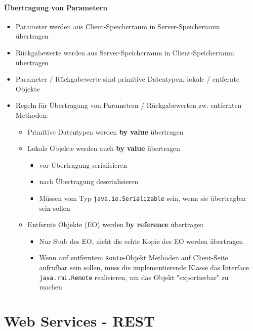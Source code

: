 \documentclass[a4paper]{article}
\begin{document}
				\paragraph{Übertragung von Parametern}
				
					\begin{itemize}
						\item Parameter werden aus Client-Speicherraum in Server-Speicherraum übertragen
						\item Rückgabewerte werden aus Server-Speicherraum in Client-Speicherraum übertragen
						\item Parameter / Rückgabewerte sind primitive Datentypen, lokale / entfernte Objekte\\
						
						\item Regeln für Übertragung von Parametern / Rückgabewerten zw. entfernten Methoden:
							\begin{itemize}
								\item Primitive Datentypen werden \textbf{by value} übertragen
								\item Lokale Objekte werden auch \textbf{by value} übertragen
									\begin{itemize}
										\item vor Übertragung serialisieren
										\item nach Übertragung deserialisieren
										\item Müssen vom Typ \texttt{java.io.Serializable} sein, wenn sie übertragbar sein sollen
									\end{itemize}
								\item Entfernte Objekte (EO) werden \textbf{by reference} übertragen
									\begin{itemize}
										\item Nur Stub des EO, nicht die echte Kopie des EO werden übertragen
										\item Wenn auf entferntem \texttt{Konto}-Objekt Methoden auf Client-Seite aufrufbar sein sollen, muss die implementierende Klasse das Interface \texttt{java.rmi.Remote} realisieren, um das Objekt "exportierbar" zu machen
									\end{itemize}
 							\end{itemize}
					\end{itemize}
				
	\newpage
	\section{Web Services - REST}
	
\end{document}
